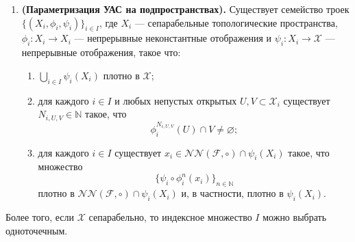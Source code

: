 \documentclass[../NDCNNAI_main.tex]{subfiles}
\begin{document}
\begin{lemma}
\begin{enumerate}[label=(\roman*)]
\item \textbf{(Параметризация УАС на подпространствах).}
Существует семейство троек $\{(X_i,\phi_i,\psi_i)\}_{i\in I}$, где
$X_i$ --- сепарабельные топологические пространства,
$\phi_i\colon X_i\to X_i$ --- непрерывные неконстантные отображения и
$\psi_i\colon X_i\to\mathcal{X}$ --- непрерывные отображения, такое что:
\begin{enumerate}[label=(\alph*)]
  \item $\displaystyle \bigcup_{i\in I}\psi_i(X_i)$ плотно в $\mathcal{X}$;
  \item для каждого $i\in I$ и любых непустых открытых $U,V\subset \mathcal{X}_i$
  существует $N_{i,U,V}\in\mathbb{N}$ такое, что
  \[
  \phi_i^{N_{i,U,V}}(U)\cap V\neq\varnothing;
  \]
  \item для каждого $i\in I$ существует $x_i\in \mathcal{NN}(\mathcal{F},\circ)\cap \psi_i(X_i)$
  такое, что множество
  \[
  \{\psi_i\circ \phi_i^n(x_i)\}_{n\in\mathbb{N}}
  \]
  плотно в $\mathcal{NN}(\mathcal{F},\circ)\cap \psi_i(X_i)$ и, в частности, плотно в $\psi_i(X_i)$.
\end{enumerate}
\end{enumerate}
Более того, если $\mathcal{X}$ сепарабельно, то индексное множество $I$ можно выбрать одноточечным.
\end{lemma}
\end{document}
